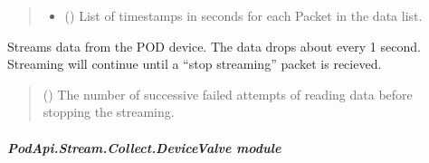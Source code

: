 \documentclass[letterpaper,10pt,english]{sphinxmanual}
\begin{document}
\begin{fulllineitems}
\begin{fulllineitems}
\begin{quote}
\begin{description}
\begin{itemize}
\item {} 
\sphinxAtStartPar
{} (\sphinxstyleliteralemphasis{\sphinxupquote{{[}}}\sphinxstyleliteralemphasis{\sphinxupquote{{]}}}) \textendash{} List of timestamps in seconds for each Packet                 in the data list.

\end{itemize}

\end{description}\end{quote}

\end{fulllineitems}


\begin{fulllineitems}
\label{\detokenize{PodApi.Stream.Collect:PodApi.Stream.Collect.DataHose.Hose._Flow}}
\pysigstartsignatures
{}
\pysigstopsignatures
\sphinxAtStartPar
Streams data from the POD device. The data drops about every 1 second.         Streaming will continue until a “stop streaming” packet is recieved.
\begin{quote}\begin{description}
\sphinxAtStartPar
{} () \textendash{} The number of successive failed attempts of reading data before stopping the streaming.

\end{description}\end{quote}

\end{fulllineitems}


\end{fulllineitems}



\subparagraph{PodApi.Stream.Collect.DeviceValve module}
\label{\detokenize{PodApi.Stream.Collect:module-PodApi.Stream.Collect.DeviceValve}}\label{\detokenize{PodApi.Stream.Collect:podapi-stream-collect-devicevalve-module}}
\end{document}
